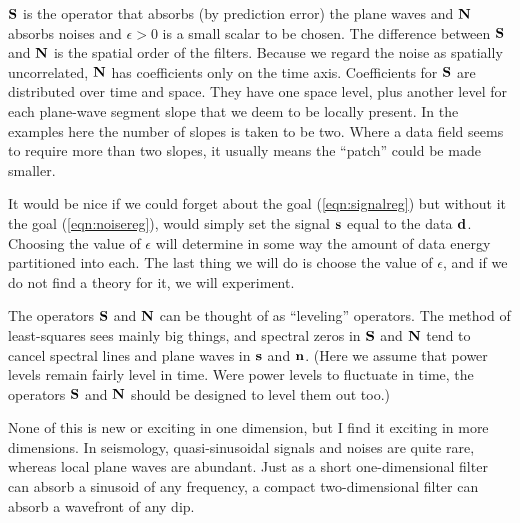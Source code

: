 $\bold S $ is the operator that absorbs (by prediction error)
the plane waves and $\bold N$ absorbs noises
and $\epsilon > 0$ is a small scalar to be chosen.
The difference between $\bold S$ and $\bold N$
is the spatial order of the filters.
Because we regard the noise as spatially uncorrelated,
$\bold N$ has coefficients only on the time axis.
Coefficients for $\bold S$
are distributed over time and space.
They have one space level,
plus another level
for each plane-wave segment slope that
we deem to be locally present.
In the examples here the number of slopes is taken to be two.
Where a data field seems to require more than two slopes,
it usually means the ``patch'' could be made smaller.
\par
It would be nice if we could forget about the goal
(\ref{eqn:signalreg})
but without it the goal
(\ref{eqn:noisereg}),
would simply set the signal $\bold s$
equal to the data $\bold d$.
Choosing the value of $\epsilon$ 
will determine in some way the amount of data energy partitioned into each.
The last thing we will do is choose the value of $\epsilon$,
and if we do not find a theory for it, we will experiment.

\par
The operators $\bold S $ and $\bold N$
can be thought of as ``leveling'' operators.
The method of least-squares sees mainly big things,
and spectral zeros in $\bold S $ and $\bold N$
tend to cancel
spectral lines and plane waves in $\bold s$ and $\bold n$.
(Here we assume that power levels remain fairly level in time.
Were power levels to fluctuate in time,
the operators $\bold S $ and $\bold N$
should be designed to level them out too.)

\par
None of this is new or exciting in one dimension,
but I find it exciting in more dimensions.
In seismology,
quasi-sinusoidal signals and noises are quite rare,
whereas local plane waves are abundant.
Just as
a short one-dimensional filter can absorb a sinusoid of any frequency,
a compact two-dimensional filter can absorb a wavefront of any dip.

